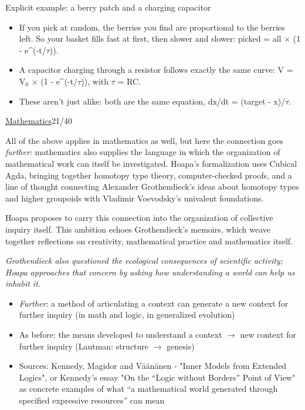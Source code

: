 \documentclass[a4paper,10pt]{article}
\newcommand{\slidehead}[2]{\par\addvspace{7pt}\noindent\underline{#1}\hfill{\color{gray}#2}\par\nopagebreak\vspace{1pt}}
\newcommand{\transition}[1]{\par{\color{black!70}\emph{#1}}\par}
\newcommand{\marked}[1]{\par\addvspace{2pt}{\bfseries #1}\par\nopagebreak}
\renewenvironment{leftbar}{%
  \def\FrameCommand{{\color{black!30}\vrule width 1.2pt}\hspace{6pt}}%
  \MakeFramed{\advance\hsize-\width \FrameRestore}}{\endMakeFramed}
\newenvironment{commentary}{\par\vspace{-2pt}\begin{leftbar}\color{black!80}}{\end{leftbar}}
\begin{document}
\begin{commentary}
\begin{itemize}
\end{itemize}
Explicit example: a berry patch and a charging capacitor\par
\begin{itemize}
\item If you pick at random, the berries you find are proportional to the berries left. So your basket fills fast at first, then slower and slower: picked = all \ensuremath{\times} (1 - e\textasciicircum{}(-t/\ensuremath{\tau})).
\item A capacitor charging through a resistor follows exactly the same curve: V = V\ensuremath{_0} \ensuremath{\times} (1 - e\textasciicircum{}(-t/\ensuremath{\tau})), with \ensuremath{\tau} = RC.
\item These aren't just alike: both are the same equation, dx/dt = (target - x)/\ensuremath{\tau}.
\end{itemize}
\end{commentary}
\slidehead{Mathematics}{21/40}
All of the above applies in mathematics as well, but here the connection goes \textcolor{emergencecoral}{\emph{further}}: mathematics also supplies the language in which the organization of mathematical work can itself be investigated. Hoapa’s formalization uses Cubical Agda, bringing together homotopy type theory, computer-checked proofs, and a line of thought connecting Alexander Grothendieck’s ideas about homotopy types and higher groupoids with Vladimir Voevodsky’s univalent foundations.\par
Hoapa proposes to carry this connection into the organization of collective inquiry itself. This ambition echoes Grothendieck’s memoirs, which weave together reflections on creativity, mathematical practice and mathematics itself.\par
\transition{Grothendieck also questioned the ecological consequences of scientific activity; Hoapa approaches that concern by asking how understanding a world can help us inhabit it.}
\begin{itemize}
\item \textcolor{emergencecoral}{\emph{Further}}: a method of articulating a context can generate a new context for further inquiry (in math and logic, in generalized evolution)
\end{itemize}
\begin{commentary}
\marked{\textcolor{emergencecoral}{Further}}
\begin{itemize}
\item As before: the means developed to understand a context \ensuremath{\to} new context for further inquiry (Lautman: structure \ensuremath{\to} genesis)
\item Sources: Kennedy, Magidor and Väänänen - "Inner Models from Extended Logics", or Kennedy's essay "On the “Logic without Borders” Point of View" as concrete examples of what “a mathematical world generated through specified expressive resources” can mean
\end{itemize}
\end{commentary}
\end{document}

